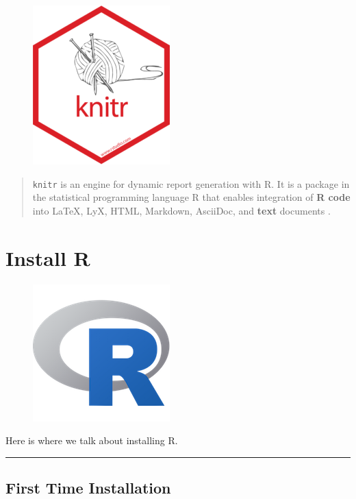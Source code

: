 \documentclass[]{book}
\theoremstyle{definition}
\theoremstyle{definition}
\theoremstyle{definition}
\theoremstyle{remark}
\begin{document}
\begin{figure}
\centering
\includegraphics{img/hex/knitr-200x232.png}
\caption{}
\end{figure}

\begin{quote}
\texttt{knitr} is an engine for dynamic report generation with R. It is
a package in the statistical programming language R that enables
integration of \textbf{R code} into LaTeX, LyX, HTML, Markdown,
AsciiDoc, and \textbf{text} documents \citep{R-knitr}.
\end{quote}

\chapter{Install R}\label{install-r}

\begin{figure}
\centering
\includegraphics{img/Rlogo_200.png}
\caption{}
\end{figure}

Here is where we talk about installing R.

\begin{center}\rule{0.5\linewidth}{\linethickness}\end{center}

\section{First Time Installation}\label{first-time-installation}
\end{document}
